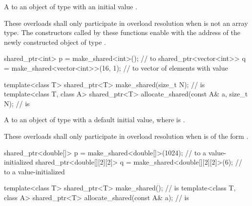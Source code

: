 \begin{itemdescr}
\pnum
\returns
A  to an object of type 
with an initial value .

\pnum
\remarks
These overloads shall only participate in overload resolution
when  is not an array type.
The  constructors called by these functions
enable 
with the address of the newly constructed object of type .

\pnum
\begin{example}
\begin{codeblock}
shared_ptr<int> p = make_shared<int>(); //  to 
shared_ptr<vector<int>> q = make_shared<vector<int>>(16, 1);
  //  to vector of  elements with value 
\end{codeblock}
\end{example}
\end{itemdescr}

%
%
\begin{itemdecl}
template<class T> shared_ptr<T>
  make_shared(size_t N);                                        //  is 
template<class T, class A>
  shared_ptr<T> allocate_shared(const A& a, size_t N);          //  is 
\end{itemdecl}

\begin{itemdescr}
\pnum
\returns
A  to an object of type 
with a default initial value,
where  is .

\pnum
\remarks
These overloads shall only participate in overload resolution
when  is of the form .

\pnum
\begin{example}
\begin{codeblock}
shared_ptr<double[]> p = make_shared<double[]>(1024);
  //  to a value-initialized 
shared_ptr<double[][2][2]> q = make_shared<double[][2][2]>(6);
  //  to a value-initialized 
\end{codeblock}
\end{example}
\end{itemdescr}

%
%
\begin{itemdecl}
template<class T>
  shared_ptr<T> make_shared();                                  //  is 
template<class T, class A>
  shared_ptr<T> allocate_shared(const A& a);                    //  is 
\end{itemdecl}

